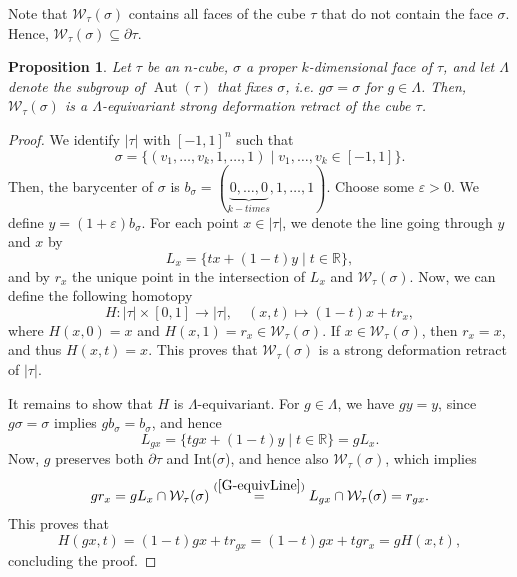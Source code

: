 \documentclass[reqno,dvipsnames]{amsart}
\theoremstyle{plain}
\newtheorem{proposition}[theorem]{Proposition}
\numberwithin{equation}{section}
\theoremstyle{definition}
\DeclareMathOperator{\Aut}{Aut}
\begin{document}
Note that $\mathcal{W}_{\tau}(\sigma)$ contains all faces of the cube $\tau$ that do not contain the face $\sigma$. Hence, $\mathcal{W}_{\tau}(\sigma)\subseteq \partial\tau$.

\begin{proposition} \label{prop:EquivariantDeformationRetract}
	Let $\tau$ be an $n$-cube, $\sigma$ a proper $k$-dimensional face of $\tau$, and let $\Lambda$ denote the subgroup of $\Aut(\tau)$ that fixes $\sigma$, i.e. $g\sigma = \sigma$ for $g\in \Lambda$. Then, $\mathcal{W}_{\tau}(\sigma)$ is a $\Lambda$-equivariant strong deformation retract of the cube $\tau$.
\end{proposition}

\begin{proof}
	We identify $\vert\tau\vert$ with $[-1,1]^n$ such that 
	\begin{equation*}
		\sigma = \{(v_1,\dots,v_k,1,\dots,1) \mid v_1,\dots,v_k\in [-1,1]\}.
	\end{equation*}
	Then, the barycenter of $\sigma$ is $b_{\sigma}=(\underbrace{0,\dots,0}_{k-times},1,\dots,1)$. Choose some $\varepsilon>0$. We define $y=(1+\varepsilon)b_{\sigma}$. For each point $x\in\vert\tau\vert$, we denote the line going through $y$ and $x$ by
	\begin{equation*}
		L_x = \{tx+(1-t)y\mid t\in \mathbb{R}\},
	\end{equation*}
	and by $r_x$ the unique point in the intersection of $L_x$ and $\mathcal{W}_{\tau}(\sigma)$. Now, we can define the following homotopy
	\[
		H\colon\vert\tau\vert\times [0,1] \rightarrow \vert\tau\vert, \quad (x,t) \mapsto (1-t)x + tr_x,
	\]
	where $H(x,0)=x$ and $H(x,1)=r_x\in\mathcal{W}_{\tau}(\sigma)$. If $x\in \mathcal{W}_{\tau}(\sigma)$, then $r_x = x$, and thus $H(x,t) = x$. This proves that $\mathcal{W}_{\tau}(\sigma)$ is a strong deformation retract of $\vert\tau\vert$.

	It remains to show that $H$ is $\Lambda$-equivariant. For $g\in \Lambda$, we have $gy=y$, since $g\sigma=\sigma$ implies $gb_{\sigma}=b_{\sigma}$, and hence
	\begin{equation}\label{G-equivLine}
		L_{gx} = \{tgx+(1-t)y\mid t\in\mathbb{R}\} =gL_x.
	\end{equation}
	Now, $g$ preserves both $\partial\tau$ and Int($\sigma$), and hence also $\mathcal{W}_{\tau}(\sigma)$, which implies
	\begin{equation*}
		gr_x = gL_x\cap \mathcal{W}_{\tau}(\sigma) \overset{(\ref{G-equivLine})}{=} L_{gx}\cap \mathcal{W}_{\tau}(\sigma) = r_{gx}.
	\end{equation*}
	This proves that
	\[
		H(gx,t) = (1-t)gx+tr_{gx} = (1-t)gx+tgr_{x} = gH(x,t),
	\]
	concluding the proof.
\end{proof}
\end{document}
